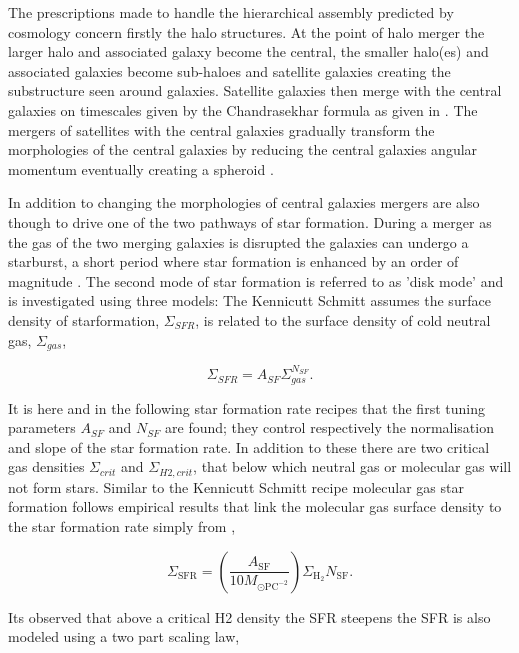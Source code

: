 The prescriptions made to handle the hierarchical assembly predicted by \LCDM cosmology concern firstly the halo structures. At the point of halo merger the larger halo and associated galaxy become the central, the smaller halo(es) and associated galaxies become sub-haloes and satellite galaxies creating the substructure seen around galaxies. Satellite galaxies then merge with the central galaxies on timescales given by the Chandrasekhar formula \citep{Chandrasekhar1943DYNAMICALFRICTION} as given in \citet{Boylan-Kolchin2008}. The mergers of satellites with the central galaxies gradually transform the morphologies of the central galaxies by reducing the central galaxies angular momentum eventually creating a spheroid \cite{Hopkins2009HOWMERGERS}. 

In addition to changing the morphologies of central galaxies mergers are also though to drive one of the two pathways of star formation. During a merger as the gas of the two merging galaxies is disrupted the galaxies can undergo a starburst, a short period where star formation is enhanced by an order of magnitude \citep{Hopkins2009HOWMERGERS}. The second mode of star formation is referred to as 'disk mode' and is investigated using three models: The Kennicutt Schmitt \citep{KennicuttJr.1998TheGalaxies} assumes the surface density of starformation, $\Sigma_{SFR}$, is related to the surface density of cold neutral gas, $\Sigma_{gas}$,

\begin{equation}
    \Sigma_{SFR} = A_{SF}\Sigma_{gas}^{N_{SF}}.
\end{equation}

It is here and in the following star formation rate recipes that the first tuning parameters $A_{SF}$ and $N_{SF}$ are found; they control respectively the normalisation and slope of the star formation rate. In addition to these there are two critical gas densities $\Sigma_{crit}$ and $\Sigma_{H2,crit}$, that below which neutral gas or molecular gas will not form stars. Similar to the Kennicutt Schmitt recipe molecular gas star formation follows empirical results that link the molecular gas surface density to the star formation rate simply from \citet{Bigiel2008TheResolution},

\begin{equation}
    \Sigma_{\mathrm{SFR}}=\left(\frac{A_{\mathrm{SF}}}{10 M_{\odot \mathrm{PC}^{-2}}}\right) \Sigma_{\mathrm{H}_{2}} N_{\mathrm{SF}}.
\end{equation}

Its observed that above a critical H2 density the SFR steepens \citep{Narayanan2012ALaw} the SFR is also modeled using a two part scaling law,

